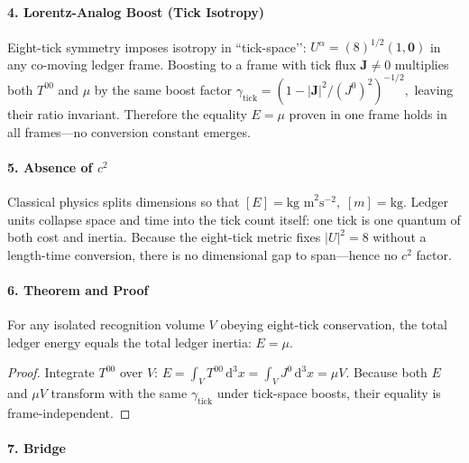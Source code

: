 \documentclass[11pt,oneside]{book}
\begin{document}
\paragraph*{4. Lorentz-Analog Boost (Tick Isotropy)}

Eight-tick symmetry imposes isotropy in “tick-space’’:
\(
   U^{\alpha} = (8)^{1/2}(1,\mathbf 0)
\)
in any co-moving ledger frame.
Boosting to a frame with tick flux \(\mathbf J\neq0\) multiplies both
$T^{00}$ and $\mu$ by the same boost factor
\(
   \gamma_{\text{tick}}
   = (1 - |\mathbf J|^{2}/(J^{0})^{2})^{-1/2},
\)
leaving their ratio invariant.
Therefore the equality \(E=\mu\) proven in one frame
holds in all frames—no conversion constant emerges.

\paragraph*{5. Absence of \boldmath$c^{2}$}

Classical physics splits dimensions so that  
\(
   [E] = \text{kg m}^{2}\text{s}^{-2},
   \;
   [m] = \text{kg}.
\)
Ledger units collapse space and time into the tick count itself:
one tick is one quantum of both cost and inertia.
Because the eight-tick metric fixes \(|U|^{2}=8\) without a length-time
conversion, there is no dimensional gap to span—hence no
$c^{2}$ factor.

\paragraph*{6. Theorem and Proof}

\begin{theorem}
For any isolated recognition volume \(V\) obeying eight-tick
conservation, the total ledger energy equals the total ledger inertia:
\(E = \mu\).
\end{theorem}

\begin{proof}
Integrate \(T^{00}\) over \(V\):
\(
   E = \int_V T^{00}\,\mathrm d^{3}x
     = \int_V J^{0}\,\mathrm d^{3}x
     = \mu V.
\)
Because both \(E\) and \(\mu V\) transform with the same
$\gamma_{\text{tick}}$ under tick-space boosts,
their equality is frame-independent.
\end{proof}

\paragraph*{7. Bridge}
\end{document}
